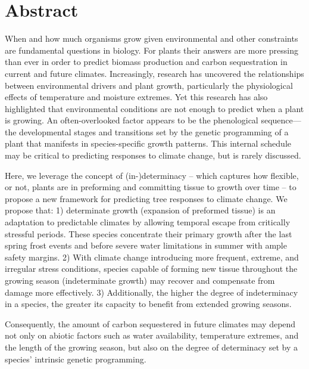 \documentclass{article}
\begin{document}
\section*{Abstract} %
	When and how much organisms grow given environmental and other constraints are fundamental questions in biology. For plants their answers are more pressing than ever in order to predict biomass production and carbon sequestration in current and future climates. Increasingly, research has uncovered the relationships between environmental drivers and plant growth, particularly the physiological effects of temperature and moisture extremes. Yet this research has also highlighted that environmental conditions are not enough to predict when a plant is growing. An often-overlooked factor appears to be the phenological sequence---the developmental stages and transitions set by the genetic programming of a plant that manifests in species-specific growth patterns. This internal schedule may be critical to predicting responses to climate change, but is rarely discussed. 
	
	Here, we leverage the concept of (in-)determinacy -- which captures how flexible, or not, plants are in preforming and committing tissue to growth over time -- to propose a new framework for predicting tree responses to climate change. We propose that: 1) determinate growth (expansion of preformed tissue) is an adaptation to predictable climates by allowing temporal escape from critically stressful periods. These species concentrate their primary growth after the last spring frost events and before severe water limitations in summer with ample safety margins.  2) With climate change introducing more frequent, extreme, and irregular stress conditions, species capable of forming new tissue throughout the growing season (indeterminate growth) may recover and compensate from damage more effectively. 3) Additionally, the higher the degree of indeterminacy in a species, the greater its capacity to benefit from extended growing seasons. 
	
	Consequently, the amount of carbon sequestered in future climates may depend not only on abiotic factors such as water availability, temperature extremes, and the length of the growing season, but also on the degree of determinacy set by a species' intrinsic genetic programming.\\
		
\end{document}
